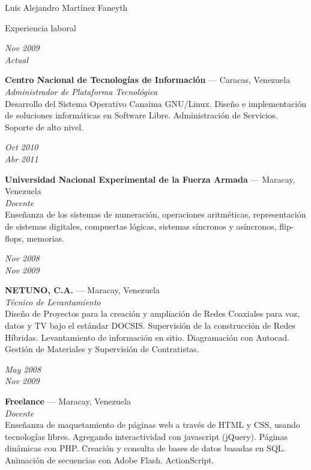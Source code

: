 \documentclass[11pt,letterpaper]{article}
\begin{document}
\begin{cv}{Luis Alejandro Mart\'inez Faneyth}
\begin{cvlist}{Experiencia laboral}
\item[{\parbox[t]{6em}{\textit{\large{Nov 2009\\Actual}}}}]{
	\parbox[t]{\linewidth}{
		\textbf{Centro Nacional de Tecnolog\'ias de Informaci\'on} --- Caracas, Venezuela\\
		\textit{Administrador de Plataforma Tecnol\'ogica}\\
		\footnotesize{Desarrollo del Sistema Operativo Canaima GNU/Linux. Dise\~no e implementaci\'on de soluciones inform\'aticas en Software Libre. Administraci\'on de Servicios. Soporte de alto nivel.}
	}
}
\item[{\parbox[t]{6em}{\textit{\large{Oct 2010\\Abr 2011}}}}]{
	\parbox[t]{\linewidth}{
		\textbf{Universidad Nacional Experimental de la Fuerza Armada} --- Maracay, Venezuela\\
		\textit{Docente}\\
		\footnotesize{Ense\~nanza de los sistemas de numeraci\'on, operaciones aritm\'eticas, representaci\'on de sistemas digitales, compuertas l\'ogicas, sistemas s\'incronos y as\'incronos, flip-flops, memorias.}
	}
}
\item[{\parbox[t]{6em}{\textit{\large{Nov 2008\\Nov 2009}}}}]{
	\parbox[t]{\linewidth}{
		\textbf{NETUNO, C.A.} --- Maracay, Venezuela\\
		\textit{T\'ecnico de Levantamiento}\\
		\footnotesize{Dise\~no de Proyectos para la creaci\'on y ampliaci\'on de Redes Coaxiales para voz, datos y TV bajo el est\'andar DOCSIS. Supervisi\'on de la construcci\'on de Redes H\'ibridas. Levantamiento de informaci\'on en sitio. Diagramaci\'on con Autocad. Gesti\'on de Materiales y Supervisi\'on de Contratistas.}
	}
}
\item[{\parbox[t]{6em}{\textit{\large{May 2008\\Nov 2009}}}}]{
	\parbox[t]{\linewidth}{
		\textbf{Freelance} --- Maracay, Venezuela\\
		\textit{Docente}\\
		\footnotesize{Ense\~nanza de maquetamiento de p\'aginas web a trav\'es de HTML y CSS, usando tecnolog\'ias libres. Agregando interactividad con javascript (jQuery). P\'aginas din\'amicas con PHP. Creaci\'on y consulta de bases de datos basadas en SQL. Animaci\'on de secuencias con Adobe Flash. ActionScript.}
	}
}
\end{cvlist}


\end{cv}
\end{document}
